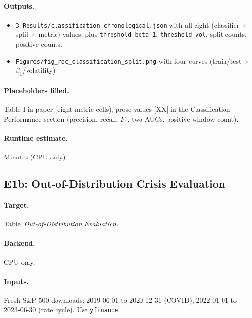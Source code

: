 \documentclass[11pt]{article}
\begin{document}
\paragraph*{Outputs.}
\begin{itemize}[leftmargin=*]
  \item \texttt{3\_Results/classification\_chronological.json} with
        all eight (classifier $\times$ split $\times$ metric) values,
        plus \texttt{threshold\_beta\_1}, \texttt{threshold\_vol},
        split counts, positive counts.
  \item \texttt{Figures/fig\_roc\_classification\_split.png} with
        four curves (train/test $\times$ $\beta_1$/volatility).
\end{itemize}

\paragraph*{Placeholders filled.} Table I in paper (eight metric
cells), prose values [XX] in the Classification Performance section
(precision, recall, $F_1$, two AUCs, positive-window count).

\paragraph*{Runtime estimate.} Minutes (CPU only).

\subsection{E1b: Out-of-Distribution Crisis Evaluation}

\paragraph*{Target.} Table~\emph{Out-of-Distribution Evaluation}.

\paragraph*{Backend.} CPU-only.

\paragraph*{Inputs.} Fresh S\&P 500 downloads:
2019-06-01 to 2020-12-31 (COVID), 2022-01-01 to 2023-06-30 (rate
cycle). Use \texttt{yfinance}.
\end{document}
